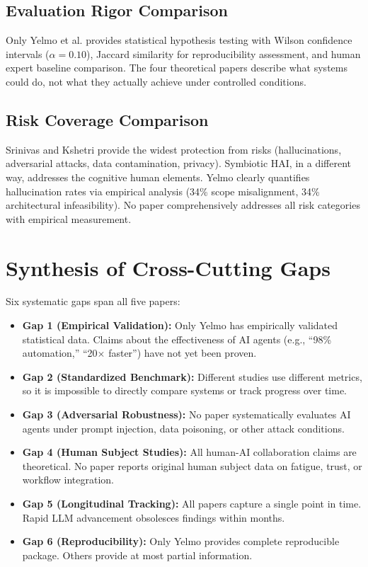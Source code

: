 \documentclass[journal]{IEEEtran}
\begin{document}
\subsection{Evaluation Rigor Comparison}
Only Yelmo et al. provides statistical hypothesis testing with Wilson confidence intervals ($\alpha=0.10$), Jaccard similarity for reproducibility assessment, and human expert baseline comparison. The four theoretical papers describe what systems could do, not what they actually achieve under controlled conditions.

\subsection{Risk Coverage Comparison}
Srinivas and Kshetri provide the widest protection from risks (hallucinations, adversarial attacks, data contamination, privacy). Symbiotic HAI, in a different way, addresses the cognitive human elements. Yelmo clearly quantifies hallucination rates via empirical analysis (34\% scope misalignment, 34\% architectural infeasibility). No paper comprehensively addresses all risk categories with empirical measurement.

\section{Synthesis of Cross-Cutting Gaps}
Six systematic gaps span all five papers:

\begin{itemize}
    \item \textbf{Gap 1 (Empirical Validation):} Only Yelmo has empirically validated statistical data. Claims about the effectiveness of AI agents (e.g., ``98\% automation,'' ``20$\times$ faster'') have not yet been proven.
    \item \textbf{Gap 2 (Standardized Benchmark):} Different studies use different metrics, so it is impossible to directly compare systems or track progress over time.
    \item \textbf{Gap 3 (Adversarial Robustness):} No paper systematically evaluates AI agents under prompt injection, data poisoning, or other attack conditions.
    \item \textbf{Gap 4 (Human Subject Studies):} All human-AI collaboration claims are theoretical. No paper reports original human subject data on fatigue, trust, or workflow integration.
    \item \textbf{Gap 5 (Longitudinal Tracking):} All papers capture a single point in time. Rapid LLM advancement obsolesces findings within months.
    \item \textbf{Gap 6 (Reproducibility):} Only Yelmo provides complete reproducible package. Others provide at most partial information.
\end{itemize}
\end{document}

